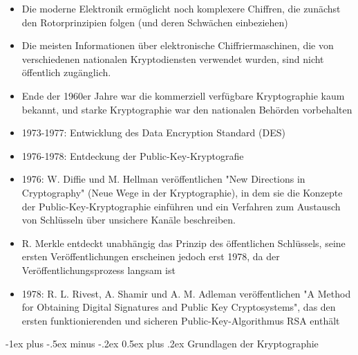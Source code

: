 \documentclass[a4paper]{article}
\makeatletter
\renewcommand{\section}{\@startsection{section}{1}{0mm}%
 {-1ex plus -.5ex minus -.2ex}%
 {0.5ex plus .2ex}%
 {\normalfont\large\bfseries}}
\makeatother
\begin{document}
\begin{multicols}{3}
\begin{itemize}
              \begin{itemize}
                  \item
                        Die moderne Elektronik ermöglicht noch komplexere Chiffren, die
                        zunächst den Rotorprinzipien folgen (und deren Schwächen
                        einbeziehen)
                  \item
                        Die meisten Informationen über elektronische Chiffriermaschinen, die
                        von verschiedenen nationalen Kryptodiensten verwendet wurden, sind
                        nicht öffentlich zugänglich.
                  \item
                        Ende der 1960er Jahre war die kommerziell verfügbare Kryptographie
                        kaum bekannt, und starke Kryptographie war den nationalen Behörden
                        vorbehalten
                  \item
                        1973-1977: Entwicklung des Data Encryption Standard (DES)
                  \item
                        1976-1978: Entdeckung der Public-Key-Kryptografie
                  \item
                        1976: W. Diffie und M. Hellman veröffentlichen "New Directions in
                        Cryptography" (Neue Wege in der Kryptographie), in dem sie die
                        Konzepte der Public-Key-Kryptographie einführen und ein Verfahren
                        zum Austausch von Schlüsseln über unsichere Kanäle beschreiben.
                  \item
                        R. Merkle entdeckt unabhängig das Prinzip des öffentlichen
                        Schlüssels, seine ersten Veröffentlichungen erscheinen jedoch erst
                        1978, da der Veröffentlichungsprozess langsam ist
                  \item
                        1978: R. L. Rivest, A. Shamir und A. M. Adleman veröffentlichen "A
                        Method for Obtaining Digital Signatures and Public Key
                        Cryptosystems", das den ersten funktionierenden und sicheren
                        Public-Key-Algorithmus RSA enthält
              \end{itemize}
    \end{itemize}


    \section{Grundlagen der
      Kryptographie}


\end{multicols}
\end{document}
